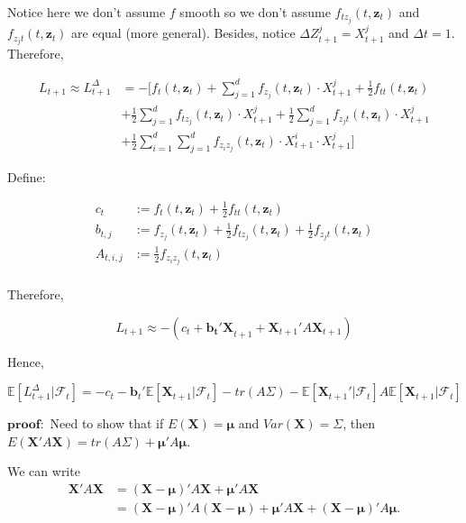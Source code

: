 \documentclass[letterpaper,11pt]{article}
\begin{document}
\begin{spacing}{1.2}
Notice here we don't assume $f$ smooth so we don't assume $f_{tz_j}(t,\bm{z}_t)$ and $f_{z_jt}(t,\bm{z}_t)$ are equal (more general). Besides, notice $\Delta Z_{t+1}^j = X_{t+1}^j$ and $\Delta t = 1$. Therefore,

\begin{equation}
\begin{aligned}
L_{t+1} \approx L_{t+1}^{\Delta} &= -[f_t(t,\bm{z}_t)+ \sum_{j=1}^d f_{z_j}(t,\bm{z}_t) \cdot X_{t+1}^j + \frac{1}{2} f_{tt}(t,\bm{z}_t) \\
&+ \frac{1}{2} \sum_{j=1}^d f_{tz_j}(t,\bm{z}_t) \cdot X_{t+1}^j + \frac{1}{2} \sum_{j=1}^d f_{z_jt}(t,\bm{z}_t) \cdot X_{t+1}^j \\
&+ \frac{1}{2} \sum_{i=1}^d \sum_{j=1}^d f_{z_iz_j}(t,\bm{z}_t) \cdot X_{t+1}^i \cdot X_{t+1}^j]
\end{aligned}
\end{equation}

Define:

\begin{equation}
\begin{aligned}
c_t &:= f_t(t,\bm{z}_t) + \frac{1}{2} f_{tt}(t,\bm{z}_t) \\
b_{t,j} &:= f_{z_j}(t,\bm{z}_t) + \frac{1}{2} f_{tz_j}(t,\bm{z}_t) + \frac{1}{2} f_{z_jt}(t,\bm{z}_t) \\
A_{t,i,j} &:= \frac{1}{2} f_{z_iz_j}(t,\bm{z}_t) \\
\end{aligned}
\end{equation}

Therefore,

\begin{equation}
L_{t+1} \approx -(c_t + \bm{b_t'X}_{t+1} + \bm{X}_{t+1}'A\bm{X}_{t+1})
\end{equation}

Hence,

\begin{equation}
\mathbb{E}[L_{t+1}^{\Delta} | \mathcal{F}_t] = -c_t - \bm{b}_t' \mathbb{E}[\bm{X}_{t+1} | \mathcal{F}_t] - tr(A \Sigma) - \mathbb{E}[\bm{X}_{t+1}' | \mathcal{F}_t] A \mathbb{E}[\bm{X}_{t+1} | \mathcal{F}_t]
\end{equation}

$\bm{proof:}$ Need to show that if $E(\bm{X}) = \bm{\mu}$ and $Var(\bm{X}) = \Sigma$, then $E(\bm{X}'A\bm{X}) = tr(A\Sigma) + \bm{\mu}'A\bm{\mu}$.

We can write
\begin{equation}
\begin{aligned}
\bm{X}'A\bm{X} &= (\bm{X} - \bm{\mu})'A\bm{X} + \bm{\mu}'A\bm{X} \\
&= (\bm{X} - \bm{\mu})'A(\bm{X} - \bm{\mu}) + \bm{\mu}'A\bm{X} + (\bm{X} - \bm{\mu})'A\bm{\mu}.
\end{aligned}
\end{equation}


\end{spacing}
\end{document}
